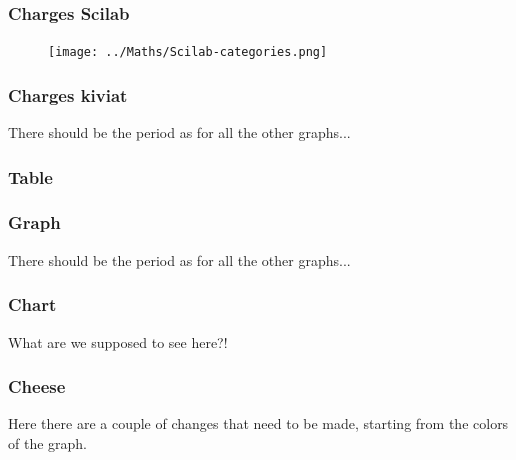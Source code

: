 \documentclass[8pt]{article} %
\begin{document}
\subsubsection{Charges Scilab}
\begin{figure}
\begin{center}
\texttt{[image: ../Maths/Scilab-categories.png]}

\end{center}
\end{figure}

\subsubsection{Charges kiviat}


There should be the period as for all the other graphs...\\

\subsubsection{Table}



\subsubsection{Graph}


There should be the period as for all the other graphs...\\

\subsubsection{Chart}
What are we supposed to see here?!\\

\subsubsection{Cheese}


Here there are a couple of changes that need to be made, starting from the colors of the graph.\\
\end{document}
